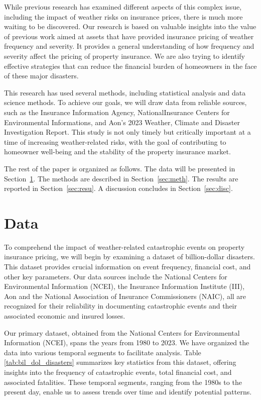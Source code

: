 \documentclass[12pt]{article}
\begin{document}
While previous research has examined different aspects of this complex issue, including the impact of weather risks on insurance 
prices, there is much more waiting to be discovered. Our research is based on valuable insights into the value of previous work 
\cite{hurricaneco} aimed at assets that have provided insurance pricing of weather frequency and severity. It provides a general 
understanding of how frequency and severity affect the pricing of property insurance. We are also trying to identify effective 
strategies that can reduce the financial burden of homeowners in the face of these major disasters.


This research has used several methods, including statistical analysis and data science methods. To achieve our goals, we will draw 
data from reliable sources, such as the Insurance Information Agency, NationalInsurance Centers for Environmental Informations, and Aon's 2023 
Weather, Climate and Disaster Investigation Report. This study is not only timely but critically important at a time of increasing 
weather-related risks, with the goal of contributing to homeowner well-being and the stability of the property insurance market.

The rest of the paper is organized as follows.
The data will be presented in Section~\ref{sec:data}.
The methods are described in Section~\ref{sec:meth}.
The results are reported in Section~\ref{sec:resu}.
A discussion concludes in Section~\ref{sec:disc}.


\section{Data}
\label{sec:data}
To comprehend the impact of weather-related catastrophic events on property insurance pricing, we will begin by examining a dataset of 
billion-dollar disasters. This dataset provides crucial information on event frequency, financial cost, and other key parameters. Our 
data sources include the National Centers for Environmental Information (NCEI)\cite{ncei}, the Insurance Information Institute 
(III)\cite{iii}, Aon\cite{aon} and the National Association of Insurance Commissioners (NAIC)\cite{naic}, all are recognized for their 
reliability in documenting catastrophic events and their associated economic and insured losses.

Our primary dataset, obtained from the National Centers for Environmental Information (NCEI)\cite{ncei}, spans the years from 1980 to 
2023. We have organized the data into various temporal segments to facilitate analysis. Table \ref{tab:bil_dol_disasters} 
summarizes key statistics from this dataset, offering insights into the frequency of catastrophic events, total financial cost, and 
associated fatalities. These temporal segments, ranging from the 1980s to the present day, enable us to assess trends over time and 
identify potential patterns.
\end{document}

